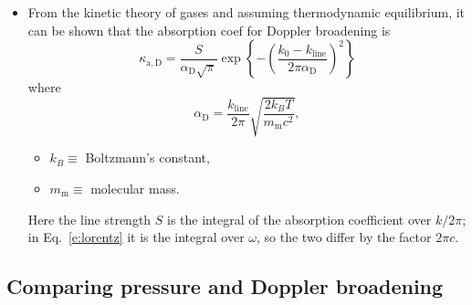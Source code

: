 \documentclass[11pt, oneside]{article}
\begin{document}
\begin{itemize}
	\item[--] From the kinetic theory of gases and assuming thermodynamic equilibrium, it can be shown that the absorption coef for Doppler broadening is
	\begin{equation}
		\label{e:doppler}
		\kappa_{\mathrm{a},\mathrm{D}} = \frac{S}{\alpha_\mathrm{D}\sqrt{\pi}}\exp\left\{-\left(\frac{k_0-k_\mathrm{line}}{2\pi\alpha_\mathrm{D}}\right)^2\right\}
	\end{equation}
	where
	\begin{equation}
		\label{e:alphaD}
		\alpha_\mathrm{D} = \frac{k_\mathrm{line}}{2\pi}\sqrt{\frac{2k_BT}{m_\mathrm{m}c^2}},
	\end{equation}
	\begin{itemize}
		\item[] $k_B \equiv$ Boltzmann's constant,
		\item[] $m_\mathrm{m} \equiv$ molecular mass.
	\end{itemize}
	Here the line strength $S$ is the integral of the absorption coefficient over $k/2\pi$; in Eq.~\eqref{e:lorentz} it is the integral over $\omega$, so the two differ by the factor $2\pi c$.
\end{itemize}

\subsection{Comparing pressure and Doppler broadening}
\label{s:compare}
\end{document}
